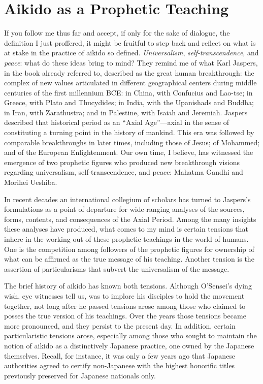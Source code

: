 \section*{Aikido as a Prophetic Teaching}

If you follow me thus far and accept, if only for the sake of dialogue, the definition I just proffered, it might be fruitful to step back and reflect on what is at stake in the practice of aikido so defined. \emph{Universalism}, \emph{self-transcendence}, and \emph{peace}: what do these ideas bring to mind? They remind me of what Karl Jaspers, in the book already referred to, described as the great human breakthrough: the complex of new values articulated in different geographical centers during middle centuries of the first millennium BCE: in China, with Confucius and Lao-tse; in Greece, with Plato and Thucydides; in India, with the Upanishads and Buddha; in Iran, with Zarathustra; and in Palestine, with Isaiah and Jeremiah. Jaspers described that historical period as an ``Axial Age''---axial in the sense of constituting a turning point in the history of mankind. This era was followed by comparable breakthroughs in later times, including those of Jesus; of Mohammed; and of the European Enlightenment. Our own time, I believe, has witnessed the emergence of two prophetic figures who produced new breakthrough visions regarding universalism, self-transcendence, and peace: Mahatma Gandhi and Morihei Ueshiba.

In recent decades an international collegium of scholars has turned to Jaspers's formulations as a point of departure for wide-ranging analyses of the sources, forms, contents, and consequences of the Axial Period. Among the many insights these analyses have produced, what comes to my mind is certain tensions that inhere in the working out of these prophetic teachings in the world of humans. One is the competition among followers of the prophetic figures for ownership of what can be affirmed as the true message of his teaching. Another tension is the assertion of particularisms that subvert the universalism of the message. 

The brief history of aikido has known both tensions. Although O'Sensei's dying wish, eye witnesses tell us, was to implore his disciples to hold the movement together, not long after he passed tensions arose among those who claimed to posses the true version of his teachings. Over the years those tensions became more pronounced, and they persist to the present day. In addition, certain particularistic tensions arose, especially among those who sought to maintain the notion of aikido as a distinctively Japanese practice, one owned by the Japanese themselves. Recall, for instance, it was only a few years ago that Japanese authorities agreed to certify non-Japanese with the highest honorific titles previously preserved for Japanese nationals only.


